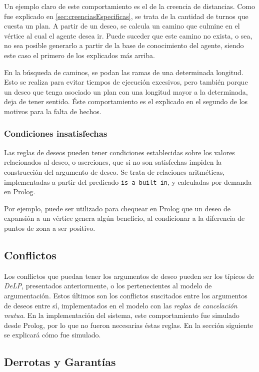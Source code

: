 \documentclass[oneside]{book}
\theoremstyle{definition}
\theoremstyle{example}
\begin{document}
Un ejemplo claro de este comportamiento es el de la creencia de distancias. Como fue explicado en 
\ref{sec:creenciasEspecificas}, se trata de la cantidad de turnos que cuesta un plan. A partir de un
deseo, se calcula un camino que culmine en el vértice al cual el agente desea ir. Puede suceder que 
este camino no exista, o sea, no sea posible generarlo a partir de la base de conocimiento del 
agente, siendo este caso el primero de los explicados más arriba. 

En la búsqueda de caminos, se podan las ramas de una determinada longitud. Esto se realiza para evitar
tiempos de ejecución excesivos, pero también porque un deseo que tenga asociado un plan con una 
longitud mayor a la determinada, deja de tener sentido. Éste comportamiento es el explicado en el 
segundo de los motivos para la falta de hechos.

\subsubsection{Condiciones insatisfechas}

Las reglas de deseos pueden tener condiciones establecidas sobre los valores relacionados al deseo,
o aserciones, que
si no son satisfechas impiden la construcción del argumento de deseo. Se trata de relaciones aritméticas,
implementadas a partir del predicado \texttt{is\_a\_built\_in}, y calculadas por demanda en Prolog.

Por ejemplo, puede ser utilizado para chequear en Prolog que un deseo de expansión a un vértice genera
algún beneficio, al condicionar a la diferencia de puntos de zona a ser positivo.

\subsection{Conflictos}

Los conflictos que puedan tener los argumentos de deseo pueden ser los típicos de \textit{DeLP},
presentados anteriormente, o
los pertenecientes al modelo de argumentación. Estos últimos son los conflictos suscitados entre 
los argumentos de deseos entre sí, implementados en el modelo con las \textit{reglas de cancelación
mutua}. En la implementación del sistema, este comportamiento fue simulado desde Prolog, por lo que 
no fueron necesarias éstas reglas. En la sección siguiente se explicará cómo fue simulado.

\subsection{Derrotas y Garantías}
\end{document}

